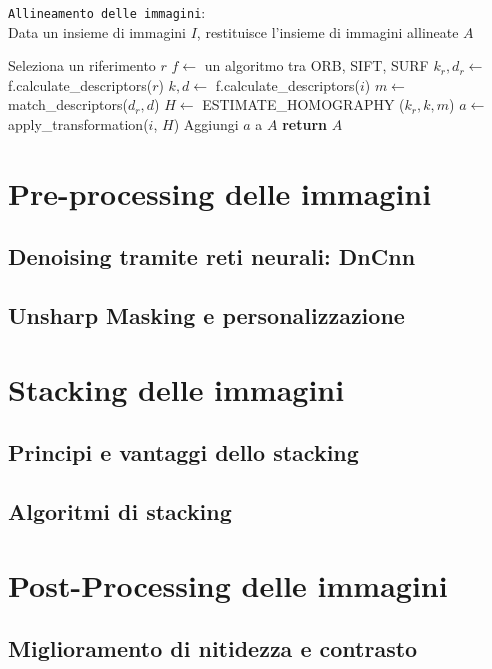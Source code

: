 \begin{algorithm}[H] \caption{\texttt{Allineamento delle immagini}:\\ Data un insieme di immagini $I$, restituisce l'insieme di immagini allineate $A$} \label{alg:align}
    \begin{algorithmic}[1]
            \State Seleziona un riferimento $r$ 
            \State $f \gets$ un algoritmo tra ORB, SIFT, SURF
            \State $k_{r}, d_{r} \gets$ f.calculate\_descriptors($r$) 
                \State $k, d \gets$ f.calculate\_descriptors($i$) 
                \State $m \gets$ match\_descriptors($d_{r}, d$) 
                \State $H \gets$ \small ESTIMATE\_HOMOGRAPHY \normalsize ($k_{r}, k, m$) 
                \State $a \gets$ apply\_transformation($i$, $H$) 
                \State Aggiungi $a$ a $A$
            \EndFor
            \State \textbf{return} $A$
        \EndFunction
    \end{algorithmic}
\end{algorithm}

\section{Pre-processing delle immagini} \label{sec:preprocessing}

\subsection{Denoising tramite reti neurali: DnCnn} \label{subsec:denoising}

\subsection{Unsharp Masking e personalizzazione} \label{subsec:unsharp_mask}

\section{Stacking delle immagini} \label{sec:stacking}

\subsection{Principi e vantaggi dello stacking} \label{subsec:stacking_intro}

\subsection{Algoritmi di stacking} \label{subsec:atacking_algo}

\section{Post-Processing delle immagini} \label{sec:postprocess}

\subsection{Miglioramento di nitidezza e contrasto} \label{subsec:contrast}

\cleardoublepage